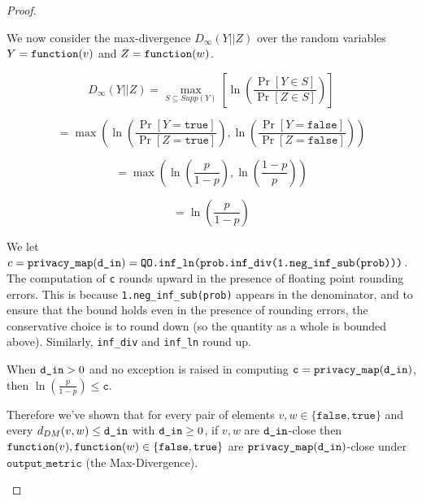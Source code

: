 \documentclass{article}
\begin{document}
\begin{proof}
\begin{enumerate}
    We now consider the max-divergence $D_{\infty}(Y||Z)$ over the random variables $Y = \texttt{function}(v)$ and $Z = \texttt{function}(w)$.
    
    \[
    D_{\infty}(Y||Z) = \max_{S \subseteq Supp(Y)}\left[\ln (\frac{\Pr[Y \in S]}{\Pr[Z \in S]})\right] 
    \]
    
    \[
    = \max\left(\ln (\frac{\Pr[Y = \texttt{true}]}{\Pr[Z = \texttt{true}]}), \ln(\frac{\Pr[Y = \texttt{false}]}{\Pr[Z = \texttt{false}]})\right)
    \]
    
    \[
    = \max\left(\ln (\frac{p}{1 - p}), \ln(\frac{1 - p}{p})\right)
    \]
    
    \[
    = \ln (\frac{p}{1 - p})
    \]

    We let $c = \texttt{privacy\_map}(\texttt{d\_in}) = \texttt{QO.inf\_ln(prob.inf\_div(1.neg\_inf\_sub(prob)))}$.
    The computation of \texttt{c} rounds upward in the presence of floating point rounding errors. 
    This is because \texttt{1.neg\_inf\_sub(prob)} appears in the denominator, and to ensure that the bound holds even in the presence of rounding errors, the conservative choice is to round down (so the quantity as a whole is bounded above). 
    Similarly, \texttt{inf\_div} and \texttt{inf\_ln} round up. 
    
    When $\texttt{d\_in} > 0$ and no exception is raised in computing $\texttt{c} = \texttt{privacy\_map}(\texttt{d\_in})$, then $\ln\left(\frac{p}{1 - p}\right) \leq \texttt{c}$. 
    
    Therefore we've shown that for every pair of elements $v,w \in \{\texttt{false}, \texttt{true}\}$ and every $d_{DM}(v,w) \le \texttt{d\_in}$ with $\texttt{d\_in} \ge 0$, 
    if $v,w$ are $\texttt{d\_in}$-close then $\texttt{function}(v),\texttt{function}(w) \in \{\texttt{false},\texttt{true}\}$ are $\texttt{privacy\_map}(\texttt{d\_in})$-close under $\texttt{output\_metric}$ (the Max-Divergence).
\end{enumerate}
\end{proof}
\end{document}
